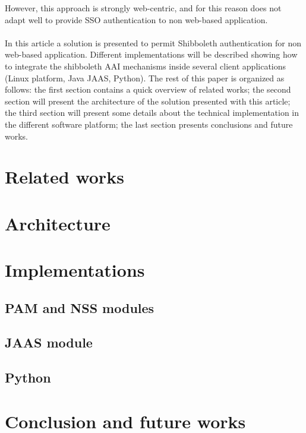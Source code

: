 However, this approach is strongly web-centric, and for this reason does not adapt well to provide SSO authentication to non web-based application.\\
\\
In this article a solution is presented to permit Shibboleth authentication for non web-based application.
Different implementations will be described showing how to integrate the shibboleth AAI mechanisms inside several client applications (Linux platform, Java JAAS, Python).
The rest of this paper is organized as follows: the first section contains a quick overview of related works; the second section will present the architecture of
the solution presented with this article; the third section will present some details about the technical implementation in the different software platform; the last
section presents conclusions and future works.

\label{sec:relatedworks}
\section{Related works}

\label{sec:architecture}
\section{Architecture}

\label{sec:implementations}
\section{Implementations}

\label{sec:pamnss}
\subsection{PAM and NSS modules}

\label{sec:jaas}
\subsection{JAAS module}

\label{sec:python}
\subsection{Python}

\label{sec:conclusion}
\section{Conclusion and future works}

